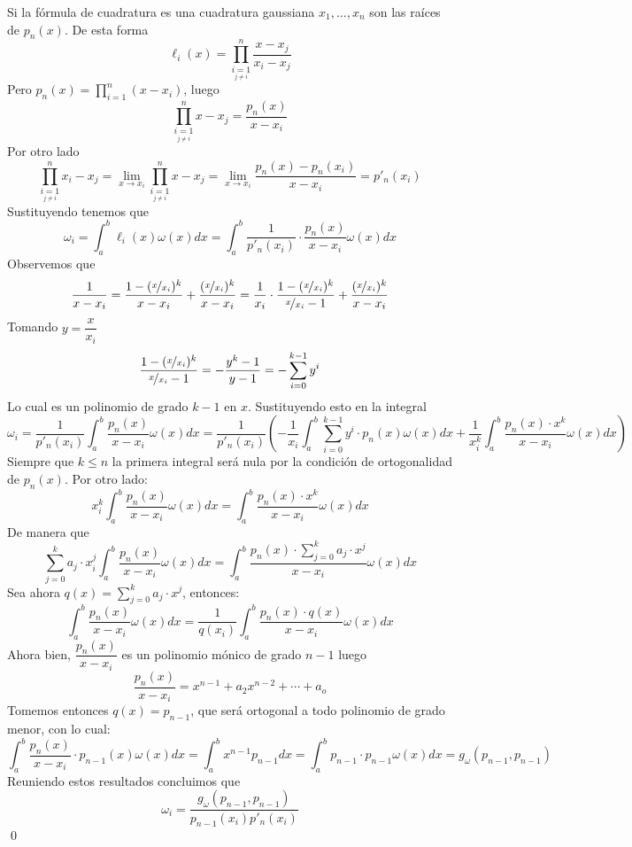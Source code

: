  \begin{dem}
 Si la fórmula de cuadratura es una cuadratura gaussiana $x_1,\ldots,x_n$ son las raíces de $p_n(x)$. De esta forma
 $$\ell_i(x)=\prod_{\underset{j\neq i}{i=1}}^n\dfrac{x-x_j}{x_i-x_j}$$
 Pero $p_n(x)=\prod_{i=1}^n(x-x_i)$, luego
 $$\prod_{\underset{j\neq i}{i=1}}^nx-x_j=\dfrac{p_n(x)}{x-x_i}$$
 Por otro lado
 $$\prod_{\underset{j\neq i}{i=1}}^nx_i-x_j=\lim_{x\to x_i}\prod_{\underset{j\neq i}{i=1}}^nx-x_j=\lim_{x\to x_i}\dfrac{p_n(x)-p_n(x_i)}{x-x_i}=p'_n(x_i)$$
 Sustituyendo tenemos que
 $$\omega_i=\int_a^b\ell_i(x)\omega(x)dx=\int_a^b\dfrac{1}{p'_n(x_i)}\cdot\dfrac{p_n(x)}{x-x_i}\omega(x)dx$$
 Observemos que
 $$\dfrac{1}{x-x_i}=\dfrac{1-(\nicefrac{x}{x_i})^k}{x-x_i}+\dfrac{(\nicefrac{x}{x_i})^k}{x-x_i}=\dfrac{1}{x_i}\cdot \dfrac{1-(\nicefrac{x}{x_i})^k}{\nicefrac{x}{x_i}-1}+\dfrac{(\nicefrac{x}{x_i})^k}{x-x_i}$$
 Tomando $y=\dfrac{x}{x_i}$
 $$\dfrac{1-(\nicefrac{x}{x_i})^k}{\nicefrac{x}{x_i}-1}=-\dfrac{y^k-1}{y-1}=-\sum_{i=0}^{k-1}y^i$$
 Lo cual es un polinomio de grado $k-1$ en $x$. Sustituyendo esto en la integral
 $$\omega_i=\dfrac{1}{p'_n(x_i)}\int_a^b\dfrac{p_n(x)}{x-x_i}\omega(x)dx=\dfrac{1}{p'_n(x_i)}\left(-\dfrac{1}{x_i}\int_a^b\sum_{i=0}^{k-1}y^i\cdot p_n(x)\omega(x)dx+\dfrac{1}{x_i^k}\int_a^b\dfrac{p_n(x)\cdot x^k}{x-x_i}\omega(x)dx\right)$$
 Siempre que $k\leq n$ la primera integral será nula por la condición de ortogonalidad de $p_n(x)$. Por otro lado:
 $$x_i^k\int_a^b\dfrac{p_n(x)}{x-x_i}\omega(x)dx=\int_a^b\dfrac{p_n(x)\cdot x^k}{x-x_i}\omega(x)dx$$
 De manera que
 $$\sum_{j=0}^ka_j\cdot x_i^j\int_a^b\dfrac{p_n(x)}{x-x_i}\omega(x)dx=\int_a^b\dfrac{p_n(x)\cdot\sum_{j=0}^ka_j\cdot x^j}{x-x_i}\omega(x)dx$$
 Sea ahora $q(x)=\sum_{j=0}^ka_j\cdot x^j$, entonces:
 $$\int_a^b\dfrac{p_n(x)}{x-x_i}\omega(x)dx=\dfrac{1}{q(x_i)}\int_a^b\dfrac{p_n(x)\cdot q(x)}{x-x_i}\omega(x)dx$$
 Ahora bien, $\dfrac{p_n(x)}{x-x_i}$ es un polinomio mónico de grado $n-1$ luego
 $$\dfrac{p_n(x)}{x-x_i}=x^{n-1}+a_2x^{n-2}+\cdots+a_o$$
 Tomemos entonces $q(x)=p_{n-1}$, que será ortogonal a todo polinomio de grado menor, con lo cual:
 $$\int_a^b\dfrac{p_n(x)}{x-x_i}\cdot p_{n-1}(x)\omega(x)dx=\int_a^bx^{n-1}p_{n-1}dx=\int_a^bp_{n-1}\cdot p_{n-1}\omega(x)dx=g_{\omega}(p_{n-1},p_{n-1})$$
 Reuniendo estos resultados concluimos que
 $$\omega_i=\dfrac{g_{\omega}(p_{n-1},p_{n-1})}{p_{n-1}(x_i)p'_n(x_i)}$$
 \qed\end{dem}
